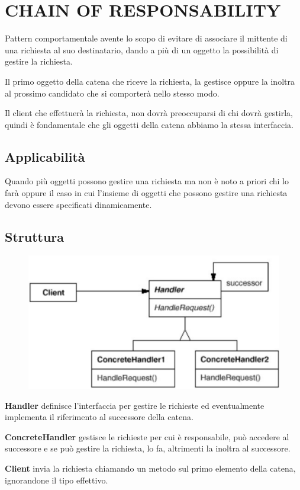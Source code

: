 \chapter{CHAIN OF RESPONSABILITY}

Pattern comportamentale avente lo scopo di evitare di associare il mittente di una richiesta al suo destinatario, dando a più di un oggetto la possibilità di gestire 
la richiesta.

Il primo oggetto della catena che riceve la richiesta, la gestisce oppure la inoltra al prossimo candidato che si comporterà nello stesso modo. 

Il client che effettuerà la richiesta, non dovrà preoccuparsi di chi dovrà gestirla, quindi è fondamentale che gli oggetti della catena abbiamo la stessa interfaccia.

\section{Applicabilità}

Quando più oggetti possono gestire una richiesta ma non è noto a priori chi lo farà oppure il caso in cui l’insieme di oggetti che possono gestire una richiesta devono 
essere specificati dinamicamente.

\section{Struttura}

\begin{figure}[h]
    \centering
    \includegraphics[width=0.4\linewidth]{../../immagini/chain_of_responsability/struttura_handler}
\end{figure}

\textbf{Handler} definisce l'interfaccia per gestire le richieste ed eventualmente implementa il riferimento al successore della catena.

\textbf{ConcreteHandler} gestisce le richieste per cui è responsabile, può accedere al successore e se può gestire la richiesta, lo fa, altrimenti la inoltra al 
successore.

\textbf{Client} invia la richiesta chiamando un metodo sul primo elemento della catena, ignorandone il tipo effettivo.

